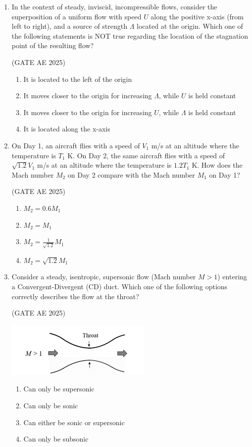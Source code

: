 \documentclass[journal,12pt,onecolumn]{IEEEtran}
\theoremstyle{remark}
\begin{document}
\begin{flushleft}
\begin{enumerate}
\item In the context of steady, inviscid, incompressible flows, consider the superposition of a uniform flow with speed $U$ along the positive x-axis (from left to right), and a source of strength $\Lambda$ located at the origin. Which one of the following statements is NOT true regarding the location of the stagnation point of the resulting flow?

\hfill (GATE AE 2025)

\begin{enumerate}
     \item It is located to the left of the origin
    \item It moves closer to the origin for increasing $\Lambda$, while $U$ is held constant
    \item It moves closer to the origin for increasing $U$, while $\Lambda$ is held constant
    \item It is located along the x-axis
\end{enumerate}

\item  On Day 1, an aircraft flies with a speed of $V_1$ m/s at an altitude where the temperature is $T_1$ K. On Day 2, the same aircraft flies with a speed of $\sqrt{1.2}V_1$ m/s at an altitude where the temperature is $1.2T_1$ K. How does the Mach number $M_2$ on Day 2 compare with the Mach number $M_1$ on Day 1?

\hfill (GATE AE 2025)

\begin{enumerate}
    \item $M_2 = 0.6 M_1$
    \item $M_2 = M_1$
    \item $M_2 = \frac{1}{\sqrt{1.2}} M_1$
    \item $M_2 = \sqrt{1.2} M_1$
\end{enumerate}
    
\item Consider a steady, isentropic, supersonic flow (Mach number $M > 1$) entering a Convergent-Divergent (CD) duct. Which one of the following options correctly describes the flow at the throat?

\hfill (GATE AE 2025)

\begin{center}
\includegraphics[width=0.5\columnwidth]{figs/throat.png}
\caption{}
    \label{fig:placeholder}
\end{center}
\begin{enumerate}
    \item Can only be supersonic
    \item Can only be sonic
    \item Can either be sonic or supersonic
    \item Can only be subsonic
\end{enumerate}


\end{enumerate}
\end{flushleft}
\end{document}
